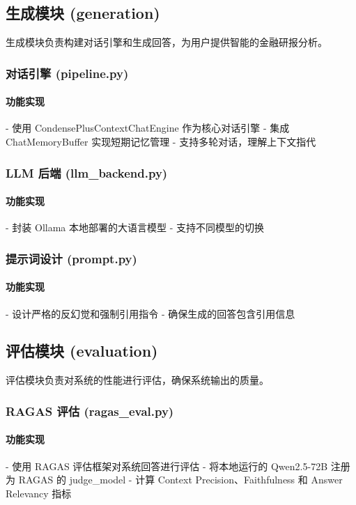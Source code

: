 \subsection{生成模块 (generation)}

生成模块负责构建对话引擎和生成回答，为用户提供智能的金融研报分析。

\subsubsection{对话引擎 (pipeline.py)}

\paragraph{功能实现}
- 使用 CondensePlusContextChatEngine 作为核心对话引擎
- 集成 ChatMemoryBuffer 实现短期记忆管理
- 支持多轮对话，理解上下文指代

\subsubsection{LLM 后端 (llm_backend.py)}

\paragraph{功能实现}
- 封装 Ollama 本地部署的大语言模型
- 支持不同模型的切换

\subsubsection{提示词设计 (prompt.py)}

\paragraph{功能实现}
- 设计严格的反幻觉和强制引用指令
- 确保生成的回答包含引用信息

\subsection{评估模块 (evaluation)}

评估模块负责对系统的性能进行评估，确保系统输出的质量。

\subsubsection{RAGAS 评估 (ragas_eval.py)}

\paragraph{功能实现}
- 使用 RAGAS 评估框架对系统回答进行评估
- 将本地运行的 Qwen2.5-72B 注册为 RAGAS 的 judge_model
- 计算 Context Precision、Faithfulness 和 Answer Relevancy 指标

